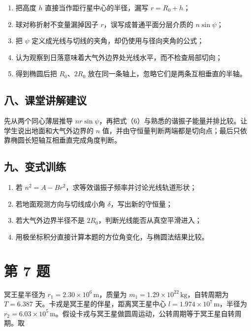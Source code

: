 \documentclass[12pt,a4paper,UTF8]{ctexart}
\newcommand{\tightlist}{\setlength{\itemsep}{0pt}\setlength{\parskip}{0pt}}
\begin{document}
\begin{enumerate}
\def\labelenumi{\arabic{enumi}.}
\tightlist
\item
  把高度 \(h\) 直接当作距行星中心的半径，漏写 \(r=R_0+h\)；
\item
  球对称折射不变量漏掉因子 \(r\)，误写成普通平面分层介质的
  \(n\sin\psi\)；
\item
  把 \(\psi\) 定义成光线与切线的夹角，却仍使用与径向夹角的公式；
\item
  认为观察到日落意味着大气外边界处光线水平，而不检查局部切向；
\item
  得到椭圆后把 \(R_0\)、\(2R_0\)
  放在同一条轴上，忽略它们是两条互相垂直的半轴。
\end{enumerate}

\subsection{八、课堂讲解建议}\label{ux516bux8bfeux5802ux8bb2ux89e3ux5efaux8bae-5}

先从两个同心薄层推导
\(nr\sin\psi\)，再把式（6）与熟悉的谐振子能量并排比较。让学生说出地面和大气外边界的
\(n\)
值，并由守恒量判断两端都是切向点；最后只依靠椭圆长短轴互相垂直完成角度判断。

\subsection{九、变式训练}\label{ux4e5dux53d8ux5f0fux8badux7ec3-5}

\begin{enumerate}
\def\labelenumi{\arabic{enumi}.}
\tightlist
\item
  若 \(n^2=A-Br^2\)，求等效谐振子频率并讨论光线轨道形状；
\item
  若地面观测方向与切线成小角 \(\delta\)，写出新的守恒量；
\item
  若大气外边界半径不是 \(2R_0\)，判断光线能否从真空平滑进入；
\item
  用极坐标积分直接计算本题的方位角变化，与椭圆法结果比较。
\end{enumerate}

\newpage

\section{第 7 题}\label{ux7b2c-7-ux9898}

冥王星半径为 \(r_1=2.30\times10^6\,\mathrm m\)，质量为
\(m_1=1.29\times10^{22}\,\mathrm{kg}\)，自转周期为 \(T=6.387\)
天。卡戎是冥王星的伴星，距离冥王星中心
\(l=1.974\times10^7\,\mathrm m\)，半径为
\(r_2=6.03\times10^5\,\mathrm m\)。假设卡戎与冥王星做圆周运动，公转周期等于冥王星自转周期。取
\end{document}
